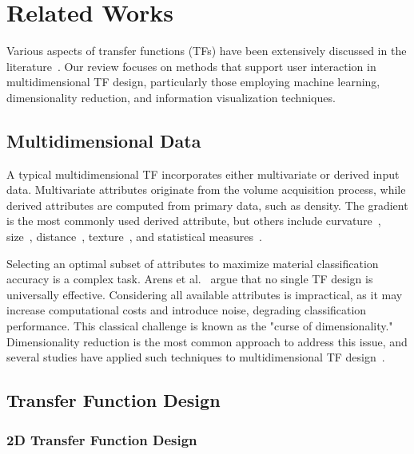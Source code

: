 \section{Related Works}
\label{sect:related-works}

Various aspects of transfer functions (TFs) have been extensively discussed in the literature~\cite{ljung2016}. Our review focuses on methods that support user interaction in multidimensional TF design, particularly those employing machine learning, dimensionality reduction, and information visualization techniques.

\subsection{Multidimensional Data}
\label{subsect:multidimensional-data}

A typical multidimensional TF incorporates either multivariate or derived input data. Multivariate attributes originate from the volume acquisition process, while derived attributes are computed from primary data, such as density. The gradient is the most commonly used derived attribute, but others include curvature~\cite{hladuvka2000, kindlmann2003}, size~\cite{correa2008, wesarg2009}, distance~\cite{tappenbeck2006}, texture~\cite{caban2008}, and statistical measures~\cite{haidacher2010}.

Selecting an optimal subset of attributes to maximize material classification accuracy is a complex task. Arens et al.~\cite{arens2010} argue that no single TF design is universally effective. Considering all available attributes is impractical, as it may increase computational costs and introduce noise, degrading classification performance. This classical challenge is known as the "curse of dimensionality." Dimensionality reduction is the most common approach to address this issue, and several studies have applied such techniques to multidimensional TF design~\cite{cai2017, abbasloo2016, gao2022, moura2007, zhao2010}.

\subsection{Transfer Function Design}
\label{subsect:transfer-function-design}

\subsubsection{2D Transfer Function Design}

